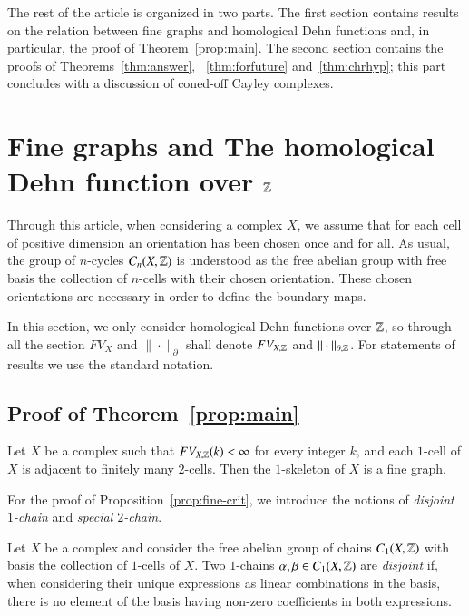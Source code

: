 The rest of the article is organized in two parts.  The first section contains results on the relation between fine graphs and homological Dehn functions and, in particular,  
the proof of  Theorem~\ref{prop:main}. The second section contains the proofs of Theorems~\ref{thm:answer}, ~\ref{thm:forfuture} and~\ref{thm:chrhyp}; this part concludes with a discussion of coned-off Cayley complexes.


\section{Fine graphs and The homological Dehn function over $\mathbb{Z}$}

Through this article, when considering a complex $X$,   we assume that for each cell of positive dimension an orientation has been chosen once and for all.  
As usual,  the group of $n$-cycles $C_n(X, \mathbb{Z})$  is understood as the free abelian group with free basis the collection of $n$-cells with their chosen orientation. These chosen orientations are necessary in order to define the boundary maps.   

In this section, we only consider homological Dehn functions over $\mathbb{Z}$, so through all the section  $FV_{X}$ and $\|\cdot\|_\partial$ shall denote $FV_{X, \mathbb{Z}}$ and $\|\cdot \|_{\partial, \mathbb{Z}}$. For statements of results we use the standard notation. 

\subsection{Proof of Theorem~\ref{prop:main}}

\begin{proposition}\label{prop:fine-crit}
Let $X$ be a  complex such that $FV_{X, \mathbb{Z}}(k)<\infty$ for every integer $k$, and each $1$-cell of $X$ is adjacent to finitely many $2$-cells.  Then the $1$-skeleton of $X$ is a fine graph.
\end{proposition}

For the proof of Proposition~\ref{prop:fine-crit}, we  introduce the notions of  \emph{disjoint $1$-chain} and \emph{special $2$-chain}. 

\begin{definition}
Let $X$ be a complex and consider the free abelian group of chains $C_1(X, \mathbb{Z})$ with basis   the collection of $1$-cells of $X$.  Two  $1$-chains $\alpha, \beta \in C_1(X, \mathbb{Z})$ are \emph{disjoint} if,  when considering their unique expressions as linear combinations in the basis,  there is no element of the basis having non-zero coefficients in both expressions.   	
\end{definition}

